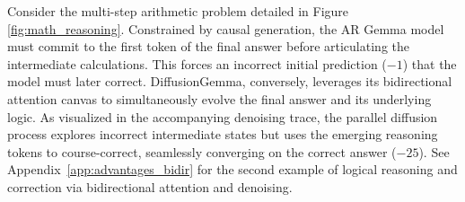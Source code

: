 \documentclass[11pt, a4paper, logo, copyright, gdm]{google}
\begin{document}
Consider the multi-step arithmetic problem detailed in Figure \ref{fig:math_reasoning}. Constrained by causal generation, the AR Gemma model must commit to the first token of the final answer before articulating the intermediate calculations. This forces an incorrect initial prediction ($-1$) that the model must later correct. DiffusionGemma, conversely, leverages its bidirectional attention canvas to simultaneously evolve the final answer and its underlying logic. As visualized in the accompanying denoising trace, the parallel diffusion process explores incorrect intermediate states but uses the emerging reasoning tokens to course-correct, seamlessly converging on the correct answer ($-25$). See Appendix~\ref{app:advantages_bidir} for the second example of logical reasoning and correction via bidirectional attention and denoising.
\end{document}
